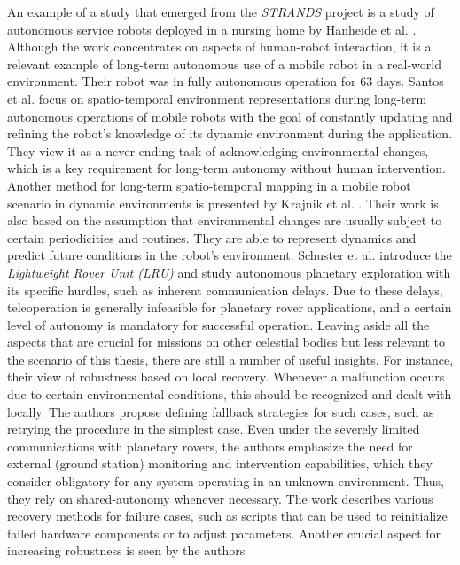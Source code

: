 \documentclass[english, master, utf8]{base/thesis_KBS}
\begin{document}
An example of a study that emerged from the \textit{STRANDS} project is a study of autonomous service robots deployed in a nursing home by Hanheide et al. \cite{Hanheide:2017}.
Although the work concentrates on aspects of human-robot interaction, it is a relevant example of long-term autonomous use of a mobile robot in a real-world environment.
Their robot was in fully autonomous operation for $63$ days.\newline
Santos et al. \cite{Santos:2017} focus on spatio-temporal environment representations during long-term autonomous operations of mobile robots with the goal of constantly updating
and refining the robot's knowledge of its dynamic environment during the application. They view it as a never-ending task of acknowledging environmental changes, which is a key
requirement for long-term autonomy without human intervention. \cite{Santos:2017}
Another method for long-term spatio-temporal mapping in a mobile robot scenario in dynamic environments is presented by Krajnik et al. \cite{Krajnik:2017}. Their work is also
based on the assumption that environmental changes are usually subject to certain periodicities and routines. They are able to represent dynamics and predict future conditions
in the robot's environment.\newline
Schuster et al. \cite{Schuster:2017} introduce the \textit{Lightweight Rover Unit (LRU)} and study autonomous planetary exploration with its specific hurdles, such as
inherent communication delays. Due to these delays, teleoperation is generally infeasible for planetary rover applications, and a certain level of autonomy is mandatory for successful
operation. \cite{Schuster:2017} Leaving aside all the aspects that are crucial for missions on other celestial bodies but less relevant to the scenario of this thesis, there are
still a number of useful insights. For instance, their view of robustness based on local recovery. Whenever a malfunction occurs due to certain environmental conditions, this should
be recognized and dealt with locally. \cite{Schuster:2017} The authors propose defining fallback strategies for such cases, such as retrying the procedure in the simplest case. Even
under the severely limited communications with planetary rovers, the authors emphasize the need for external (ground station) monitoring and intervention capabilities, which they
consider obligatory for any system operating in an unknown environment. Thus, they rely on shared-autonomy whenever necessary. The work describes various recovery methods for failure
cases, such as scripts that can be used to reinitialize failed hardware components or to adjust parameters. Another crucial aspect for increasing robustness is seen by the authors
\end{document}
